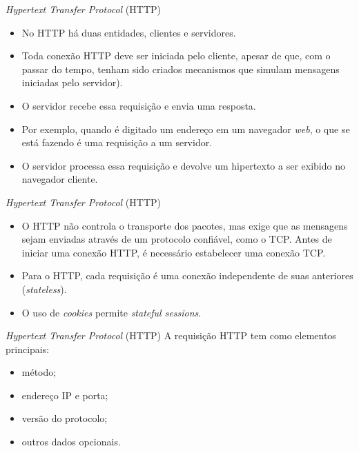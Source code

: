 \documentclass[11pt]{beamer}
\begin{document}
    \begin{frame}{\textit{Hypertext Transfer Protocol} (HTTP)}
      \begin{itemize}
        \item No HTTP há duas entidades, clientes e servidores.
        \item Toda conexão HTTP deve ser iniciada pelo cliente, apesar de que, com o passar do tempo, tenham sido criados mecanismos que simulam mensagens iniciadas pelo servidor).
        \item O servidor recebe essa requisição e envia uma resposta.
        \item Por exemplo, quando é digitado um endereço em um navegador \textit{web}, o que se está fazendo é uma requisição a um servidor.
        \item O servidor processa essa requisição e devolve um hipertexto a ser exibido no navegador cliente.
      \end{itemize}
    \end{frame}

    \begin{frame}{\textit{Hypertext Transfer Protocol} (HTTP)}
      \begin{itemize}
        \item O HTTP não controla o transporte dos pacotes, mas exige que as mensagens sejam enviadas através de um protocolo confiável, como o TCP. Antes de iniciar uma conexão HTTP, é necessário estabelecer uma conexão TCP.
        \item Para o HTTP, cada requisição é uma conexão independente de suas anteriores (\textit{stateless}).
        \item O uso de \textit{cookies} permite \textit{stateful sessions}.
      \end{itemize}
    \end{frame}

    \begin{frame}{\textit{Hypertext Transfer Protocol} (HTTP)}
      A requisição HTTP tem como elementos principais:
      \begin{itemize}
        \item método;
        \item endereço IP e porta;
        \item versão do protocolo;
        \item outros dados opcionais.
      \end{itemize}
    \end{frame}
\end{document}
